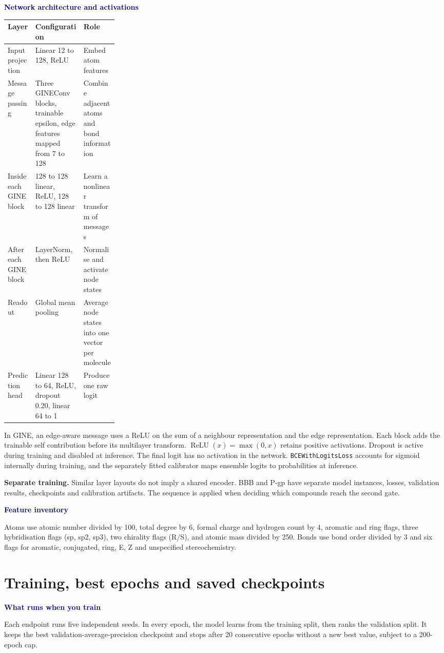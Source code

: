 \documentclass[11pt,a4paper]{article}
\newcommand{\code}[1]{\nolinkurl{#1}}
\newcommand{\lead}[1]{\par\smallskip\textbf{\textcolor{Navy}{#1}}\par\nobreak}
\newcommand{\pagehead}[1]{\clearpage\section{#1}}
\newcommand{\callout}[1]{\par\smallskip\noindent\colorbox{Pale}{\parbox{\dimexpr\linewidth-2\fboxsep\relax}{\vspace{3pt}#1\vspace{3pt}}}\par\smallskip}
\newcommand{\dense}{\small\renewcommand{\arraystretch}{1.11}\setlength{\tabcolsep}{4pt}}
\begin{document}
\lead{Network architecture and activations}
{\dense
\begin{tabularx}{\linewidth}{L{0.25\linewidth}YY}
\toprule
Layer & Configuration & Role\\
\midrule
Input projection & Linear 12 to 128, ReLU & Embed atom features\\
Message passing & Three GINEConv blocks, trainable epsilon, edge features mapped from 7 to 128 & Combine adjacent atoms and bond information\\
Inside each GINE block & 128 to 128 linear, ReLU, 128 to 128 linear & Learn a nonlinear transform of messages\\
After each GINE block & LayerNorm, then ReLU & Normalise and activate node states\\
Readout & Global mean pooling & Average node states into one vector per molecule\\
Prediction head & Linear 128 to 64, ReLU, dropout 0.20, linear 64 to 1 & Produce one raw logit\\
\bottomrule
\end{tabularx}}

In GINE, an edge-aware message uses a ReLU on the sum of a neighbour representation and the edge representation. Each block adds the trainable self contribution before its multilayer transform. $\operatorname{ReLU}(x)=\max(0,x)$ retains positive activations. Dropout is active during training and disabled at inference. The final logit has no activation in the network. \code{BCEWithLogitsLoss} accounts for sigmoid internally during training, and the separately fitted calibrator maps ensemble logits to probabilities at inference.

\callout{\textbf{Separate training.} Similar layer layouts do not imply a shared encoder. BBB and P-gp have separate model instances, losses, validation results, checkpoints and calibration artifacts. The sequence is applied when deciding which compounds reach the second gate.}

\lead{Feature inventory}
Atoms use atomic number divided by 100, total degree by 6, formal charge and hydrogen count by 4, aromatic and ring flags, three hybridisation flags (sp, sp2, sp3), two chirality flags (R/S), and atomic mass divided by 250. Bonds use bond order divided by 3 and six flags for aromatic, conjugated, ring, E, Z and unspecified stereochemistry.

\pagehead{Training, best epochs and saved checkpoints}
\lead{What runs when you train}
Each endpoint runs five independent seeds. In every epoch, the model learns from the training split, then ranks the validation split. It keeps the best validation-average-precision checkpoint and stops after 20 consecutive epochs without a new best value, subject to a 200-epoch cap.
\end{document}
